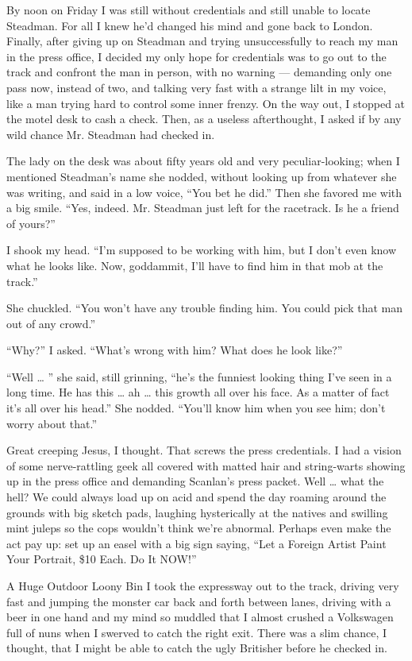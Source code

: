 \documentclass[10pt,a4paper]{article}
\begin{document}
By noon on Friday I was still without credentials and still unable to locate Steadman. For all I knew he’d changed his mind and gone back to London. Finally, after giving up on Steadman and trying unsuccessfully to reach my man in the press office, I decided my only hope for credentials was to go out to the track and confront the man in person, with no warning — demanding only one pass now, instead of two, and talking very fast with a strange lilt in my voice, like a man trying hard to control some inner frenzy. On the way out, I stopped at the motel desk to cash a check. Then, as a useless afterthought, I asked if by any wild chance Mr. Steadman had checked in.

The lady on the desk was about fifty years old and very peculiar-looking; when I mentioned Steadman’s name she nodded, without looking up from whatever she was writing, and said in a low voice, “You bet he did.” Then she favored me with a big smile. “Yes, indeed. Mr. Steadman just left for the racetrack. Is he a friend of yours?”

I shook my head. “I’m supposed to be working with him, but I don’t even know what he looks like. Now, goddammit, I’ll have to find him in that mob at the track.”

She chuckled. “You won’t have any trouble finding him. You could pick that man out of any crowd.”

“Why?” I asked. “What’s wrong with him? What does he look like?”

“Well … ” she said, still grinning, “he’s the funniest looking thing I’ve seen in a long time. He has this … ah … this growth all over his face. As a matter of fact it’s all over his head.” She nodded. “You’ll know him when you see him; don’t worry about that.”

Great creeping Jesus, I thought. That screws the press credentials. I had a vision of some nerve-rattling geek all covered with matted hair and string-warts showing up in the press office and demanding Scanlan’s press packet. Well … what the hell? We could always load up on acid and spend the day roaming around the grounds with big sketch pads, laughing hysterically at the natives and swilling mint juleps so the cops wouldn’t think we’re abnormal. Perhaps even make the act pay up: set up an easel with a big sign saying, “Let a Foreign Artist Paint Your Portrait, \$10 Each. Do It NOW!”

A Huge Outdoor Loony Bin
I took the expressway out to the track, driving very fast and jumping the monster car back and forth between lanes, driving with a beer in one hand and my mind so muddled that I almost crushed a Volkswagen full of nuns when I swerved to catch the right exit. There was a slim chance, I thought, that I might be able to catch the ugly Britisher before he checked in.
\end{document}
